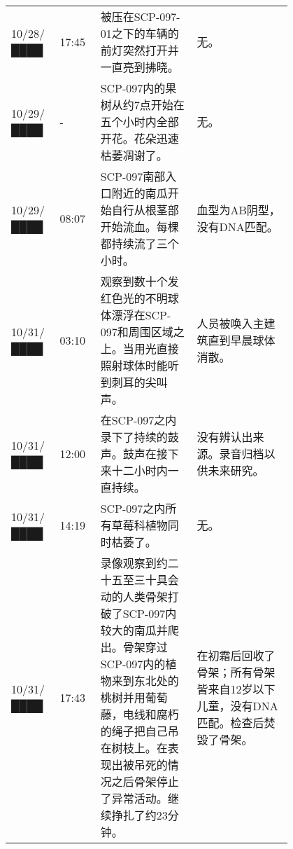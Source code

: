 \begin{longtable}{m{0.1\linewidth}m{0.1\linewidth}m{0.3\linewidth}m{0.3\linewidth}}
10\slash 28\slash ████ & 17:45 & 被压在SCP-097-01之下的车辆的前灯突然打开并一直亮到拂晓。 & 无。\\
10\slash 29\slash ████ & - & SCP-097内的果树从约7点开始在五个小时内全部开花。花朵迅速枯萎凋谢了。 & 无。\\
10\slash 29\slash ████ & 08:07 & SCP-097南部入口附近的南瓜开始自行从根茎部开始流血。每棵都持续流了三个小时。 & 血型为AB阴型，没有DNA匹配。\\
10\slash 31\slash ████ & 03:10 & 观察到数十个发红色光的不明球体漂浮在SCP-097和周围区域之上。当用光直接照射球体时能听到刺耳的尖叫声。 & 人员被唤入主建筑直到早晨球体消散。\\
10\slash 31\slash ████ & 12:00 & 在SCP-097之内录下了持续的鼓声。鼓声在接下来十二小时内一直持续。 & 没有辨认出来源。录音归档以供未来研究。\\
10\slash 31\slash ████ & 14:19 & SCP-097之内所有草莓科植物同时枯萎了。 & 无。\\
10\slash 31\slash ████ & 17:43 & 录像观察到约二十五至三十具会动的人类骨架打破了SCP-097内较大的南瓜并爬出。骨架穿过SCP-097内的植物来到东北处的桃树并用葡萄藤，电线和腐朽的绳子把自己吊在树枝上。在表现出被吊死的情况之后骨架停止了异常活动。继续挣扎了约23分钟。 & 在初霜后回收了骨架；所有骨架皆来自12岁以下儿童，没有DNA匹配。检查后焚毁了骨架。
\end{longtable}
